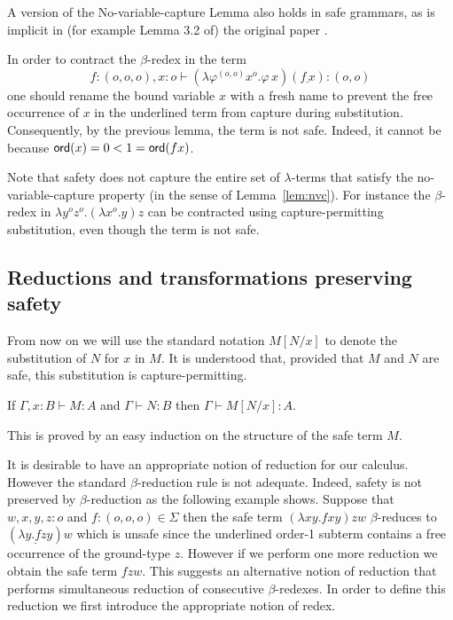 \documentclass{llncs}
\newcommand\subst[2]{\left[ #1/#2 \right]}
\newcommand\ord[1]{{\sf
    ord}(#1)} \newcommand\typear{\rightarrow}
\begin{document}
\begin{remark}
  A version of the No-variable-capture Lemma also holds in safe
  grammars, as is implicit in (for example Lemma 3.2 of) the original
  paper \cite{KNU02}.
\end{remark}

\begin{example}
  In order to contract the $\beta$-redex in the term
\[f:(o,o,o),x:o
  \vdash (\lambda \varphi^{(o,o)} x^o . \varphi \, x) (\underline{f \,
    x}) : (o,o)\] one should rename the bound variable $x$ with a fresh name to
  prevent the free occurrence of $x$ in the underlined term from
  capture during substitution. Consequently, by the previous lemma,
  the term is not safe. Indeed, it cannot be because $\ord{x} = 0 < 1
  = \ord{f x}$.
\end{example}

Note that safety does not capture the entire set of $\lambda$-terms
that satisfy the no-variable-capture property (in the sense of
Lemma~\ref{lem:nvc}). For instance the $\beta$-redex in $\lambda y^o
z^o. (\lambda x^o .y) z$ can be contracted using capture-permitting
substitution, even though the term is not safe.

\subsection*{Reductions and transformations preserving safety}

From now on we will use the standard notation $M\subst{N}{x}$ to
denote the substitution of $N$ for $x$ in $M$.  It is understood that,
provided that $M$ and $N$ are safe, this substitution is
capture-permitting.


\begin{lemma}
\label{lem:subst_preserve_safety}
If $\Gamma, x :B \vdash M : A$ and $\Gamma \vdash N : B$ then $\Gamma \vdash M[N/x] : A$.
\end{lemma}
This is proved by an easy induction on the structure of the safe term $M$.


It is desirable to have an appropriate notion of reduction for our
calculus. However the standard $\beta$-reduction rule is not
adequate. Indeed, safety is not preserved by $\beta$-reduction as the
following example shows. Suppose that $w,x,y,z : o$ and $f : (o,o,o)
\in \Sigma$ then the safe term $(\lambda x y . f x y) z w$
$\beta$-reduces to $(\underline{\lambda y . f z y}) w$ which is unsafe
since the underlined order-1 subterm contains a free occurrence of the
ground-type $z$. However if we perform one more reduction we obtain
the safe term $f z w$. This suggests an alternative notion of
reduction that performs simultaneous reduction of consecutive
$\beta$-redexes. In order to define this reduction we first introduce
the appropriate notion of redex.
\end{document}
